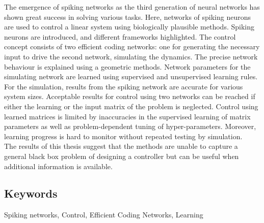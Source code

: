 
The emergence of spiking networks as the third generation of neural networks has shown great success in solving various tasks. Here, networks of spiking neurons are used to control a linear system using biologically plausible methods. Spiking neurons are introduced, and different frameworks highlighted. The control concept consists of two efficient coding networks: one for generating the necessary input to drive the second network, simulating the dynamics. The precise network behaviour is explained using a geometric methods. Network parameters for the simulating network are learned using supervised and unsupervised learning rules. For the simulation, results from the spiking network are accurate for various system sizes. Acceptable results for control using two networks can be reached if either the learning or the input matrix of the problem is neglected. Control using learned matrices is limited by inaccuracies in the supervised learning of matrix parameters as well as problem-dependent tuning of hyper-parameters. Moreover, learning progress is hard to monitor without repeated testing by simulation.\\
The results of this thesis suggest that the methods are unable to capture a general black box problem of designing a controller but can be useful when additional information is available.


\subsection*{Keywords}
Spiking networks, Control, Efficient Coding Networks, Learning



\newpage
\thispagestyle{plain}
